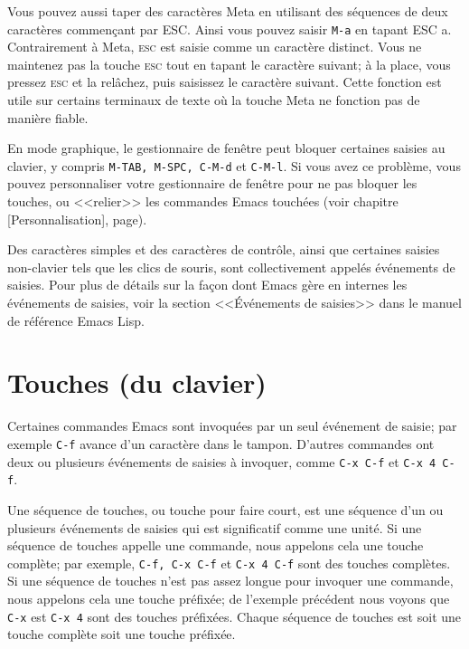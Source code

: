 Vous pouvez aussi taper des caractères Meta en utilisant des séquences
de deux caractères commençant par ESC. Ainsi vous pouvez saisir
\texttt{M-a} en tapant ESC a. Contrairement à Meta, \textsc{esc} est
saisie comme un caractère distinct. Vous ne maintenez pas la touche
\textsc{esc} tout en tapant le caractère suivant; à la place, vous
pressez \textsc{esc} et la relâchez, puis saisissez le caractère
suivant. Cette fonction est utile sur certains terminaux de texte où
la touche Meta ne fonction pas de manière fiable.\par 

En mode graphique, le gestionnaire de fenêtre peut bloquer certaines
saisies au clavier, y compris \texttt{M-TAB, M-SPC, C-M-d} et
\texttt{C-M-l}. Si vous avez ce problème, vous pouvez personnaliser
votre gestionnaire de fenêtre pour ne pas bloquer les touches, ou
<<relier>> les commandes Emacs touchées (voir chapitre
[Personnalisation], page).\par

Des caractères simples et des caractères de contrôle, ainsi que
certaines saisies non-clavier tels que les clics de souris, sont
collectivement appelés événements de saisies. Pour plus de détails sur
la façon dont Emacs gère en internes les événements de saisies, voir
la section <<\'Evénements de saisies>> dans le manuel de référence
Emacs Lisp.\par

\section{Touches (du clavier)}
Certaines commandes Emacs sont invoquées par un seul événement de
saisie; par exemple \texttt{C-f} avance d'un caractère dans le
tampon. D'autres commandes ont deux ou plusieurs événements de saisies
à invoquer, comme \texttt{C-x C-f} et \texttt{C-x 4 C-f}.\par 

Une séquence de touches, ou touche pour faire court, est une séquence
d'un ou plusieurs événements de saisies qui est significatif comme une
unité. Si une séquence de touches appelle une commande, nous appelons
cela une touche complète; par exemple, \texttt{C-f, C-x C-f} et
\texttt{C-x 4 C-f} sont des touches complètes. Si une séquence de
touches n'est pas assez longue pour invoquer une commande, nous
appelons cela une touche préfixée; de l'exemple précédent nous voyons
que \texttt{C-x} est \texttt{C-x 4} sont des touches préfixées. Chaque
séquence de touches est soit une touche complète soit une touche
préfixée.\par 

